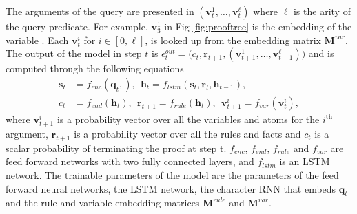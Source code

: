 The arguments of the query are presented in $(\mathbf{v}^1_t, \dots, \mathbf{v}^\ell_t)$ where $\ell$ is the arity of the query predicate. For example, $\mathbf{v}_3^1$ in Fig \ref{fig:prooftree} is the embedding of the variable . Each $\mathbf{v}^i_t$ for $i \in [0,\ell]$, is looked up from the embedding matrix $\mathbf{M}^{var}$. The output of the model in step $t$ is $\epsilon^{out}_t = \big(c_t, \mathbf{r}_{t+1}, (\mathbf{v}^1_{t+1}, \dots, \mathbf{v}^\ell_{t+1}))$ and is computed through the following equations
\begin{align}
    \mathbf{s}_t &= f_{enc}(\mathbf{q}_t,), ~~
    \mathbf{h}_t = f_{lstm}(\mathbf{s}_t, \mathbf{r}_t ,\mathbf{h}_{t-1}), \\
    c_t &= f_{end}(\mathbf{h}_t), ~~
    \mathbf{r}_{t+1} = f_{rule}(\mathbf{h}_t), ~~ %
    \mathbf{v}^i_{t+1} = f_{var}(\mathbf{v}^i_t), \label{eq:ct} %
\end{align}
where $\mathbf{v}^i_{t+1}$ is a probability vector over all the variables and atoms for the $i^{\text{th}}$ argument, $\mathbf{r}_{t+1}$ is a probability vector over all the rules and facts and $c_t$ is a scalar probability of terminating the proof at step t.
$f_{enc}$, $f_{end}$, $f_{rule}$ and $f_{var}$ are feed forward networks with two fully connected layers, and $f_{lstm}$ is an LSTM network. The trainable parameters of the model are the parameters of the feed forward neural networks, the LSTM network, the character RNN that embeds $\mathbf{q}_t$ and the rule and variable embedding matrices $\mathbf{M}^{rule}$ and $\mathbf{M}^{var}$.

